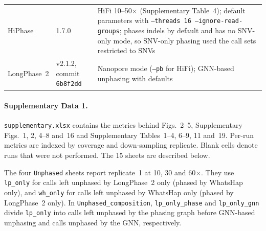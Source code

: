 \documentclass[11pt,a4paper]{article}
\newcommand{\toolname}{LongPhase~2\xspace}
\newcommand{\whatshap}{WhatsHap\xspace}
\newcommand{\code}[1]{\texttt{\small #1}}
\begin{document}
{\begin{longtable}{@{}L{4cm} L{2.6cm} L{8.8cm}@{}}
HiPhase\cite{holt2024hiphase} & 1.7.0 & HiFi 10--50$\times$ (Supplementary Table~4); default parameters with \code{--threads 16 --ignore-read-groups}; phases indels by default and has no SNV-only mode, so SNV-only phasing used the call sets restricted to SNVs \\
\toolname & v2.1.2, commit \code{6b8f2dd} & Nanopore mode (\code{--pb} for HiFi); GNN-based unphasing with defaults \\
\end{longtable}
}
\FloatBarrier


\FloatBarrier


\clearpage
\paragraph{Supplementary Data 1.} \code{supplementary.xlsx} contains the metrics behind Figs.~2--5, Supplementary Figs.~1, 2, 4--8 and~16 and Supplementary Tables~1--4, 6--9, 11 and~19. Per-run metrics are indexed by coverage and down-sampling replicate. Blank cells denote runs that were not performed. The 15 sheets are described below.

The four \code{Unphased} sheets report replicate~1 at 10, 30 and 60$\times$. They use \code{lp\_only} for calls left unphased by \toolname only (phased by \whatshap only), and \code{wh\_only} for calls left unphased by \whatshap only (phased by \toolname only). In \code{Unphased\_composition}, \code{lp\_only\_phase} and \code{lp\_only\_gnn} divide \code{lp\_only} into calls left unphased by the phasing graph before GNN-based unphasing and calls unphased by the GNN, respectively.
\end{document}
